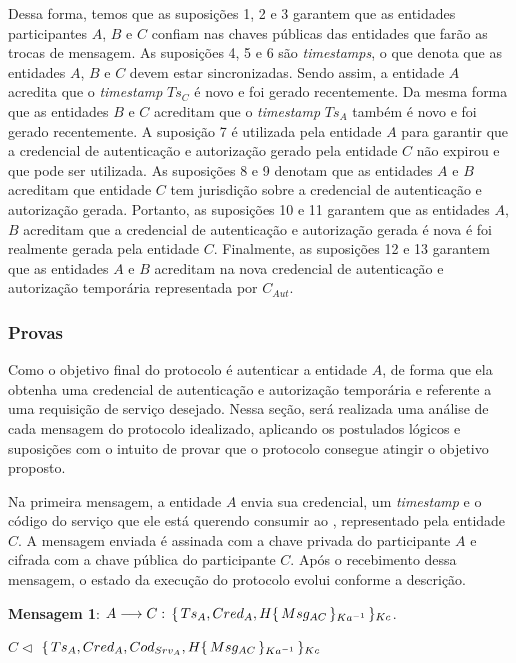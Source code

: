 Dessa forma, temos que as suposições 1, 2 e 3 garantem que as entidades participantes ${A}$, ${B}$ e ${C}$ confiam  nas chaves públicas das entidades que farão as trocas de mensagem. As suposições 4, 5 e 6 são \emph{timestamps}, o que denota que as entidades ${A}$, ${B}$ e ${C}$ devem estar sincronizadas. Sendo assim, a entidade ${A}$ acredita que o \emph{timestamp} ${Ts_C}$ é novo e foi gerado recentemente. Da mesma forma que as entidades ${B}$ e ${C}$ acreditam  que o \emph{timestamp} ${Ts_A}$ também é novo e foi gerado recentemente. A suposição 7 é utilizada pela entidade ${A}$ para garantir que a credencial de autenticação e autorização gerado pela entidade ${C}$ não expirou e que pode ser utilizada. As suposições 8 e 9 denotam que as entidades ${A}$ e ${B}$ acreditam que entidade ${C}$ tem jurisdição  sobre a credencial de autenticação e autorização gerada. Portanto, as suposições 10 e 11 garantem que as entidades ${A}$, ${B}$ acreditam que a credencial de autenticação e autorização gerada é nova é foi realmente gerada pela entidade ${C}$. Finalmente, as suposições 12 e 13 garantem que as entidades ${A}$ e ${B}$ acreditam na nova credencial de autenticação e autorização temporária representada por ${C_{Aut}}$.

\subsubsection{Provas}

Como o objetivo final do protocolo é autenticar a entidade ${A}$, de forma que ela obtenha uma credencial de autenticação e autorização temporária e referente a uma requisição de serviço desejado. Nessa seção, será realizada uma análise de cada mensagem do protocolo idealizado, aplicando os postulados lógicos e suposições com o intuito de provar que o protocolo consegue atingir o objetivo proposto.

Na primeira mensagem, a entidade ${A}$ envia sua credencial, um \emph{timestamp} e o código do serviço que ele está querendo consumir ao \servidorAA,
representado pela entidade ${C}$. A mensagem enviada é assinada com a chave privada do participante ${A}$  e cifrada com a chave pública do participante ${C}$.
Ap\'{o}s o recebimento dessa mensagem, o estado da execu\c c\~{a}o do protocolo evolui conforme a descri\c c\~{a}o.

\textbf{Mensagem 1}: ${A}\longrightarrow{C}:\,{\{\,{Ts_A,Cred_A,H{\{\,{Msg_{AC}}\,\}_{Ka ^{-1}}}}\,\}_{Kc}}$.

$C\triangleleft$ ${\{\,{Ts_A,Cred_A,Cod_{Srv_A},H{\{\,{Msg_{AC}}\,\}_{Ka ^{-1}}}}\,\}_{Kc}}$

